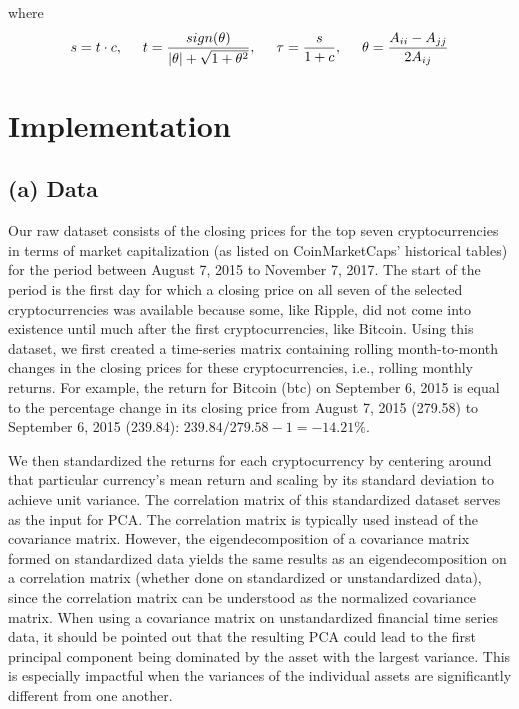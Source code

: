 \documentclass[12pt,twoside]{article}
\begin{document}
where
\[ s=t\cdot c, \hspace{5mm} t = \frac{sign(\theta)}{|\theta|+ \sqrt{1+\theta^2}}, \hspace{5mm} \tau = \frac{s}{1+c}, \hspace{5mm} \theta = \frac{A_{ii}-A_{jj}}{2A_{ij}}  \]

\section{Implementation}
\subsection{(a) Data}
Our raw dataset consists of the closing prices for the top seven cryptocurrencies in terms of market capitalization (as listed on CoinMarketCaps' historical tables) for the period between August 7, 2015 to November 7, 2017. The start of the period is the first day for which a closing price on all seven of the selected cryptocurrencies was available because some, like Ripple, did not come into existence until much after the first cryptocurrencies, like Bitcoin. Using this dataset, we first created a time-series matrix containing rolling month-to-month changes in the closing prices for these cryptocurrencies, i.e., rolling monthly returns. For example, the return for Bitcoin (btc) on September 6, 2015 is equal to the percentage change in its closing price from August 7, 2015 (279.58) to September 6, 2015 (239.84): $239.84/279.58 - 1 = -14.21\%$.

\bigbreak
We then standardized the returns for each cryptocurrency by centering around that particular currency's mean return and scaling by its standard deviation to achieve unit variance. The correlation matrix of this standardized dataset serves as the input for PCA. The correlation matrix is typically used instead of the covariance matrix. However, the eigendecomposition of a covariance matrix formed on standardized data yields the same results as an eigendecomposition on a correlation matrix (whether done on standardized or unstandardized data), since the correlation matrix can be understood as the normalized covariance matrix. When using a covariance matrix on unstandardized financial time series data, it should be pointed out that the resulting PCA could lead to the first principal component being dominated by the asset with the largest variance. This is especially impactful when the variances of the individual assets are significantly different from one another.
\end{document}
